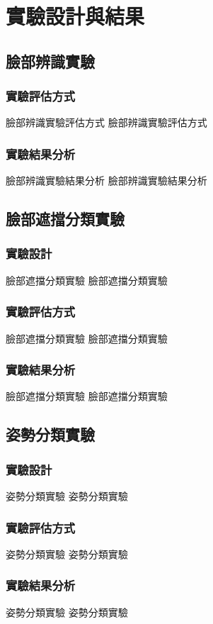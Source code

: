 \documentclass[class=NCU_thesis, crop=false]{standalone}
\begin{document}
\chapter{實驗設計與結果}

\section{臉部辨識實驗}
\subsection{實驗評估方式}
臉部辨識實驗評估方式 臉部辨識實驗評估方式

\subsection{實驗結果分析}
臉部辨識實驗結果分析 臉部辨識實驗結果分析

\section{臉部遮擋分類實驗}
\subsection{實驗設計}
臉部遮擋分類實驗 臉部遮擋分類實驗

\subsection{實驗評估方式}
臉部遮擋分類實驗 臉部遮擋分類實驗

\subsection{實驗結果分析}
臉部遮擋分類實驗 臉部遮擋分類實驗

\section{姿勢分類實驗}
\subsection{實驗設計}
姿勢分類實驗 姿勢分類實驗

\subsection{實驗評估方式}
姿勢分類實驗 姿勢分類實驗

\subsection{實驗結果分析}
姿勢分類實驗 姿勢分類實驗
\end{document}
